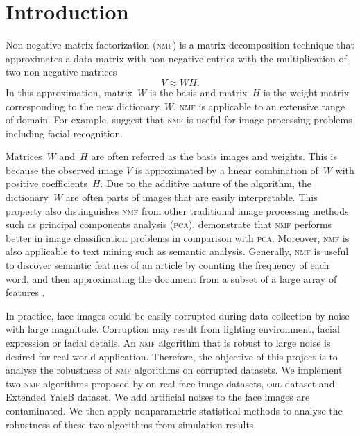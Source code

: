 \section{Introduction\label{chapter1}}
Non-negative matrix factorization (\textsc{nmf}) is a matrix decomposition technique that approximates a data matrix with non-negative entries with the multiplication of two non-negative matrices
\begin{equation*}
  V \approx WH.
\end{equation*}
In this approximation, matrix~$W$ is the basis and matrix~$H$ is the weight matrix corresponding to the new dictionary~$W$. \textsc{nmf}
is applicable to an extensive range of domain. For example, \citet{lee1999learning} suggest that \textsc{nmf} is useful for image processing problems including facial recognition.

Matrices~$W$ and~$H$ are often referred as the basis images and weights.
This is because the observed image $V$ is approximated by a linear combination of~$W$ with positive coefficients~$H$.
Due to the additive nature of the algorithm, the dictionary~$W$ are often parts of images that are easily interpretable.
This property also distinguishes \textsc{nmf} from other traditional image processing methods such as principal components analysis (\textsc{pca}).
\citet{guillamet2002non} demonstrate that \textsc{nmf} performs better in image classification problems in comparison with \textsc{pca}.
Moreover, \textsc{nmf} is also applicable to text mining such as semantic analysis.
Generally, \textsc{nmf} is useful to discover semantic features of an article by counting the frequency of each word, and then approximating the document from a subset of a large array of features \citep{lee1999learning}.

In practice, face images could be easily corrupted during data collection by noise with large magnitude. Corruption may result from lighting environment, facial expression or facial details. An \textsc{nmf} algorithm that is robust to large noise is desired for real-world application. Therefore, the objective of this project is to analyse the robustness of \textsc{nmf} algorithms on corrupted datasets. We implement two \textsc{nmf} algorithms proposed by \citet{lee2001algorithms} on real face image datasets, \textsc{orl} dataset and Extended YaleB dataset. We add artificial noises to the face images are contaminated. We then apply nonparametric statistical methods to analyse the robustness of these two algorithms from simulation results.

